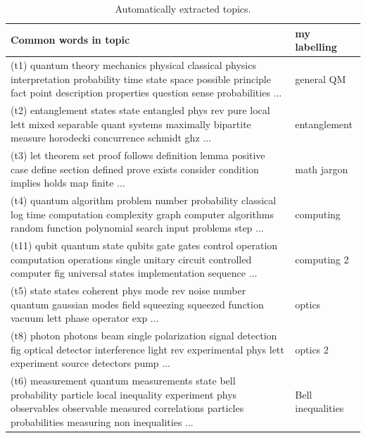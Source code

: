 \documentclass[11pt]{article}
\begin{document}
        \begin{table}[t]
        \centering
        \caption{Automatically extracted topics.}
        \vspace{0.05in}
        \begin{footnotesize}
        \begin{raggedright}
        \begin{tabular}{|p{4.7in} p{1.2in} |}
        \hline \rule{0pt}{3ex}
        Common words in topic           & my labelling \\[3pt]
        \hline \rule{0pt}{3ex}
        (t1) quantum theory mechanics physical classical physics interpretation probability time state space
        possible principle fact point description properties question sense probabilities ...
        & general QM \\

        (t2) entanglement states state entangled phys rev pure local lett mixed separable quant systems
        maximally bipartite measure horodecki concurrence schmidt ghz ...
        & entanglement \\
        (t3) let theorem set proof follows definition lemma positive case define section defined prove
        exists consider condition implies holds map finite ...
        & math jargon \\

        (t4) quantum algorithm problem number probability classical log time computation complexity graph
        computer algorithms random function polynomial search input problems step ...
        & computing \\
        (t11) qubit quantum state qubits gate gates control operation computation operations single unitary
        circuit controlled computer fig universal states implementation sequence ...
        & computing 2 \\

        (t5) state states coherent phys mode rev noise number quantum gaussian modes field squeezing
        squeezed function vacuum lett phase operator exp ...
        & optics \\
        (t8) photon photons beam single polarization signal detection fig optical detector interference
        light rev experimental phys lett experiment source detectors pump ...
        & optics 2 \\

        (t6) measurement quantum measurements state bell probability particle local inequality experiment
        phys observables observable measured correlations particles probabilities measuring non inequalities
        ...
        & Bell inequalities \\


\end{tabular}
\end{raggedright}
\end{footnotesize}
\end{table}
\end{document}
